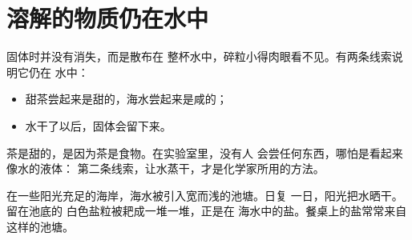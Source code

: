 \section{溶解的物质仍在水中}

\begin{proposition}[溶解的固体仍在水中]\label{prop:g2:mixing-and-dissolving:still-there}
固体时并没有消失，而是散布在
整杯水中，碎粒小得肉眼看不见。有两条线索说明它仍在
水中：
\begin{itemize}
  \item 甜茶尝起来是甜的，海水尝起来是咸的；
  \item 水干了以后，固体会留下来。
\end{itemize}
\end{proposition}

\begin{remark}[实验室里不尝味道]\label{rem:g2:mixing-and-dissolving:no-tasting}
茶是甜的，是因为茶是食物。在实验室里，没有人
会尝任何东西，哪怕是看起来像水的液体：
第二条线索，让水蒸干，才是化学家所用的方法。
\end{remark}

\begin{example}[来自海水的盐]\label{ex:g2:mixing-and-dissolving:salt-pans}
在一些阳光充足的海岸，海水被引入宽而浅的池塘。日复
一日，阳光把水晒干。留在池底的
白色盐粒被耙成一堆一堆，正是在
海水中的盐。餐桌上的盐常常来自这样的池塘。
\end{example}

